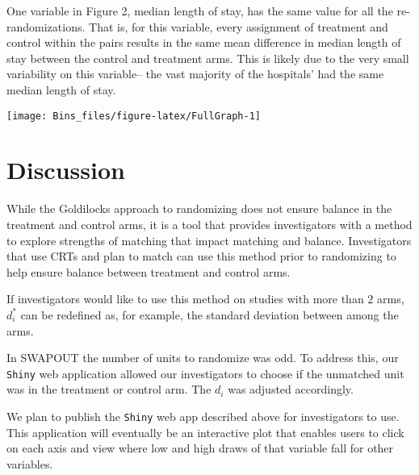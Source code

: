 \documentclass[]{article}
\begin{document}
One variable in Figure 2, median length of stay, has the same value for
all the re-randomizations. That is, for this variable, every assignment
of treatment and control within the pairs results in the same mean
difference in median length of stay between the control and treatment
arms. This is likely due to the very small variability on this
variable-- the vast majority of the hospitals' had the same median
length of stay.

\begin{center}\texttt{[image: Bins\_files/figure-latex/FullGraph-1]} \end{center}

\section{Discussion}\label{discussion}

While the Goldilocks approach to randomizing does not ensure balance in
the treatment and control arms, it is a tool that provides investigators
with a method to explore strengths of matching that impact matching and
balance. Investigators that use CRTs and plan to match can use this
method prior to randomizing to help ensure balance between treatment and
control arms.

If investigators would like to use this method on studies with more than
\(2\) arms, \(d^*_{i}\) can be redefined as, for example, the standard
deviation between among the arms.

In SWAPOUT the number of units to randomize was odd. To address this,
our \texttt{Shiny} web application allowed our investigators to choose
if the unmatched unit was in the treatment or control arm. The \(d_{i}\)
was adjusted accordingly.

We plan to publish the \texttt{Shiny} web app described above for
investigators to use. This application will eventually be an interactive
plot that enables users to click on each axis and view where low and
high draws of that variable fall for other variables.


\end{document}
